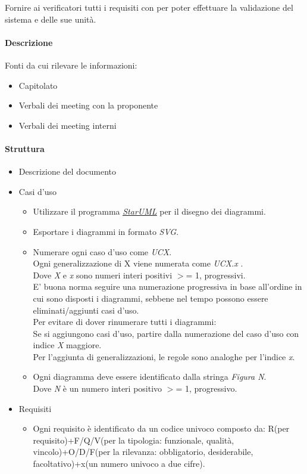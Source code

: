 \documentclass[a4paper, 12pt]{article}
\begin{document}
Fornire ai verificatori tutti i requisiti con per poter effettuare la validazione del sistema e delle sue unità.
\paragraph{Descrizione}
Fonti da cui rilevare le informazioni:
\begin{itemize}
	\item Capitolato
	\item Verbali dei meeting con la proponente
	\item Verbali dei meeting interni
\end{itemize}
\paragraph{Struttura}
\begin{itemize}
	\item Descrizione del documento
	\item Casi d'uso
	\begin{itemize}
		\item Utilizzare il programma \href{https://staruml.io/}{\textit{\underline{StarUML}}} per il disegno dei diagrammi.
		\item Esportare i diagrammi in formato \textit{SVG}.
		\item Numerare ogni caso d'uso come \textit{UCX}. \\
		Ogni generalizzazione di X viene numerata come \textit{UCX.x} .\\
		Dove \textit{X} e \textit{x} sono numeri interi positivi $>$= 1, progressivi.\\
		E' buona norma seguire una numerazione progressiva in base all'ordine in cui sono 
		disposti i diagrammi, sebbene nel tempo possono essere eliminati/aggiunti casi d'uso.\\
		Per evitare di dover rinumerare tutti i diagrammi: \\
		Se si aggiungono casi d'uso, partire dalla numerazione del caso d'uso con indice \textit{X} maggiore.\\
		Per l'aggiunta di generalizzazioni, le regole sono analoghe per l'indice \textit{x}.
		\item Ogni diagramma deve essere identificato dalla stringa \textit{Figura N}.\\
		Dove \textit{N} è un numero interi positivo $>$= 1, progressivo.
	\end{itemize}
	\item Requisiti
	\begin{itemize}
		\item Ogni requisito è identificato da un codice univoco composto da: R(per requisito)+F/Q/V(per la tipologia: 
		funzionale, qualità, vincolo)+O/D/F(per la rilevanza: obbligatorio, desiderabile, 
		facoltativo)+x(un numero univoco a due cifre).
	\end{itemize}
\end{itemize}
\end{document}

